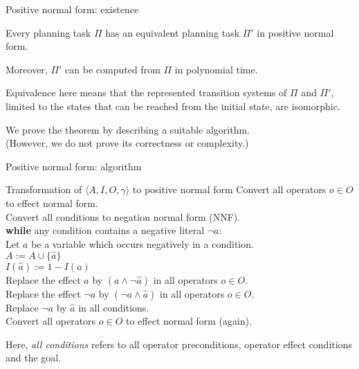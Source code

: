 \documentclass{gkibeamer}
\begin{document}
\begin{frame}{Positive normal form: existence}
  \begin{theorem}
    Every planning task $\Pi$ has an equivalent planning task $\Pi'$
    in positive normal form.

    Moreover, $\Pi'$ can be computed from $\Pi$ in polynomial time.
  \end{theorem}

   Equivalence here means that the represented
  transition systems of $\Pi$ and $\Pi'$, limited to the states that
  can be reached from the initial state, are isomorphic.

  \bigskip

  We prove the theorem by describing a suitable algorithm. \\
  (However, we do not prove its correctness or complexity.)
\end{frame}

\begin{frame}{Positive normal form: algorithm}
 \begin{block}{Transformation of $\langle A, I, O, \gamma\rangle$ to
     positive normal form}
   Convert all operators $o \in O$ to effect normal form. \\
   Convert all conditions to negation normal form (NNF). \\
   \textbf{while} any condition contains a negative literal $\neg a$:
   \\
   {}\qquad Let $a$ be a variable which occurs negatively in a
   condition. \\
   {}\qquad $A := A \cup \{\hat{a}\}$  \\
   {}\qquad $I(\hat{a}) := 1 - I(a)$ \\
   {}\qquad Replace the effect $a$ by
   $(a \land \neg \hat{a})$ in all operators $o \in O$. \\
   {}\qquad Replace the effect $\neg a$ by
   $(\neg a \land \hat{a})$ in all operators $o \in O$. \\
   {}\qquad Replace $\neg a$ by $\hat{a}$ in all conditions. \\
   Convert all operators $o \in O$ to effect normal form (again).
 \end{block}

 Here, \emph{all conditions} refers to all operator preconditions,
 operator effect conditions and the goal.

\end{frame}
\end{document}
